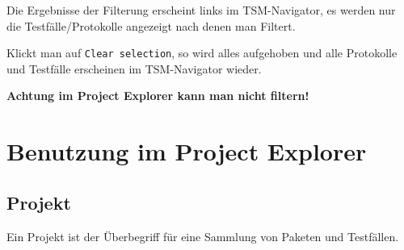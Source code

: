 \documentclass[11pt,a4paper,titlepage]{article}
\begin{document}
Die Ergebnisse der Filterung erscheint links im TSM-Navigator, es werden nur die Testfälle/Protokolle angezeigt nach denen man Filtert.

Klickt man auf \texttt{Clear selection}, so wird alles aufgehoben und alle Protokolle und Testfälle erscheinen im TSM-Navigator wieder.

\textbf{Achtung im Project Explorer kann man nicht filtern!}

\newpage
\section{Benutzung im Project Explorer}
\subsection{Projekt}
Ein Projekt ist der Überbegriff für eine Sammlung von Paketen und Testfällen.
\end{document}
